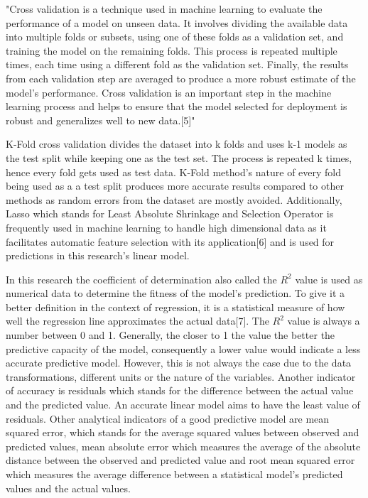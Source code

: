 \documentclass{article}
\begin{document}
"Cross validation is a technique used in machine learning to evaluate the performance of a model on unseen data. It involves dividing the available data into multiple folds or subsets, using one of these folds as a validation set, and training the model on the remaining folds. This process is repeated multiple times, each time using a different fold as the validation set. Finally, the results from each validation step are averaged to produce a more robust estimate of the model’s performance. Cross validation is an important step in the machine learning process and helps to ensure that the model selected for deployment is robust and generalizes well to new data.[5]" \par
K-Fold cross validation divides the dataset into k folds and uses k-1 models as the test split while keeping one as the test set. The process is repeated k times, hence every fold gets used as test data. K-Fold method's nature of every fold being used as a a test split produces more accurate results compared to other methods as random errors from the dataset are mostly avoided. Additionally, Lasso which stands for Least Absolute Shrinkage and Selection Operator is frequently used in machine learning to handle high dimensional data as it facilitates automatic feature selection with its application[6] and is used for predictions in this research's linear model.\par
In this research the coefficient of determination also called the $R^2$ value is used as numerical data to determine the fitness of the model's prediction. To give it a better definition in the context of regression, it is a statistical measure of how well the regression line approximates the actual data[7]. The $R^2$ value is always a number between 0 and 1. Generally, the closer to 1 the value the better the predictive capacity of the model, consequently a lower value would indicate a less accurate predictive model. However, this is not always the case due to the data transformations, different units or the nature of the variables. Another indicator of accuracy is residuals which stands for the difference between the actual value and the predicted value. An accurate linear model aims to have the least value of residuals. Other analytical indicators of a good predictive model are mean squared error, which stands for the average squared values between observed and predicted values, mean absolute error which measures the average of the absolute distance between the observed and predicted value and root mean squared error which measures the average difference between a statistical model's predicted values and the actual values.\par
\end{document}
